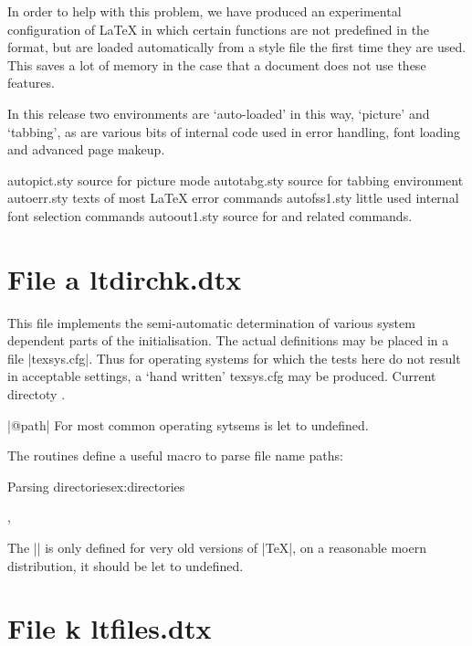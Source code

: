 In order to help with this problem, we have produced an experimental configuration of LaTeX in which certain functions are not predefined in the format, but are loaded automatically from a style file the first time they are used. This saves a lot of memory in the case that a document does not use these features.

In this release two environments are ‘auto-loaded’ in this way, ‘picture’ and ‘tabbing’, as are various bits of internal code used in error handling, font loading and advanced page makeup.

  autopict.sty      source for picture mode
  autotabg.sty      source for tabbing environment
  autoerr.sty       texts of most LaTeX error commands
  autofss1.sty      little used internal font selection commands
  autoout1.sty      source for  and related commands.

\makeatletter

\section{File a ltdirchk.dtx}

This file implements the semi-automatic determination of various system dependent
parts of the initialisation. The actual definitions may be placed in a file
|texsys.cfg|. Thus for operating systems for which the tests here do not result in
acceptable settings, a `hand written' texsys.cfg may be produced.
Current directoty .


|@path| For most common operating sytsems is let to undefined. %

The routines define a useful macro to parse file name paths:

\begin{texexample}{Parsing directories}{ex:directories}

\filename@area

\filename@base,

\filename@ext

\end{texexample}

The |\@TeXversion| is only defined for very old versions of |TeX|, on a reasonable moern distribution, it should be let to undefined.



\section{File k ltfiles.dtx}



